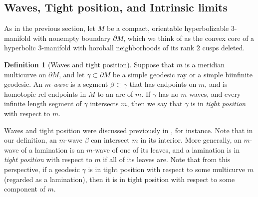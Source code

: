 \documentclass[12pt]{amsart}
\theoremstyle{definition}
\newtheorem{definition}[theorem]{Definition}
\theoremstyle{remark}
\newcommand{\BR}{\mathbb R} \newcommand{\BD}{\mathbb D}
\begin{document}
 \subsection{Waves, Tight position, and Intrinsic limits} \label{intrinsiclimitssec} 

  As in the previous section, let $M$  be a compact, orientable  hyperbolizable $3$-manifold with  nonempty boundary  $\partial M$,  which we  think of as the convex core  of a hyperbolic $3$-manifold with horoball neighborhoods of its rank $2$ cusps deleted.  




\begin {definition}[Waves  and tight position]\label{wavedef}
 Suppose that $m $ is a meridian multicurve on $\partial M $, and let $\gamma \subset \partial M $ be a simple geodesic ray or a simple biinfinite geodesic.  An \emph {$m$-wave}  is a segment $\beta \subset \gamma$ that has endpoints on $m$, and is homotopic rel endpoints in $M$ to an arc of $m$.  If $\gamma $ has no $m$-waves, and  every infinite length segment of $\gamma$ intersects $m$, then we say that $\gamma $ is in \emph {tight position} with respect to $m$.
\end {definition}
 
Waves and tight position were discussed previously in \cite{Kleineidamalgebraic,Lecuireplissage}, for instance. Note that in our definition, an $m$-wave $\beta$  can intersect $m$ in its interior.  More generally, an $m$-wave of a lamination is an $m$-wave of one of its leaves, and  a lamination is in \emph {tight position}  with respect to $m$ if all of its leaves are.  Note that from this perspective, if  a geodesic $\gamma$ is in tight position with respect to some multicurve $m$ (regarded as a lamination), then it is in tight position with respect to some component of $m$.
\end{document}
